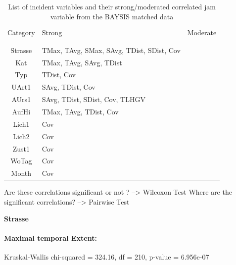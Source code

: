 \noindent
\begin{table}[ht]
	\centering
	\begin{tabular}{c|l|l}  
		Category & Strong & Moderate \\
		\\[-1em]
		\hline
		\\[-1em]
		Strasse & TMax, TAvg, SMax, SAvg, TDist, SDist, Cov & \\ 
 		Kat & TMax, TAvg, SAvg, TDist & \\ 
 		Typ & TDist, Cov & \\
 		UArt1 & SAvg, TDist, Cov & \\
 		AUrs1 & SAvg, TDist, SDist, Cov, TLHGV & \\
 		AufHi & TMax, TAvg, TDist, Cov & \\
 		Lich1 & Cov & \\
 		Lich2 & Cov & \\
 		Zust1 & Cov & \\
 		WoTag & Cov & \\
 		Month & Cov & \\
	\end{tabular}
	\caption{List of incident variables and their strong/moderated correlated jam variable from the BAYSIS matched data}
\end{table}

Are these correlations significant or not ? --> Wilcoxon Test
\smallskip
Where are the significant correlations? --> Pairwise Test

\large
\centerline{\textbf{Strasse}}
\normalsize

\paragraph{Maximal temporal Extent:}

Kruskal-Wallis chi-squared = 324.16, df = 210, p-value = 6.956e-07

